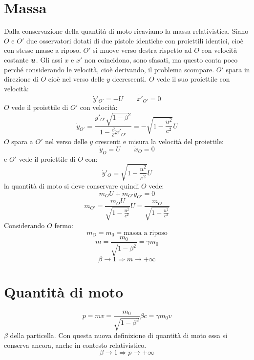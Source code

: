 \section{Massa}
Dalla conservazione della quantità di moto ricaviamo la massa relativistica. Siano $O$ e $O'$ due osservatori dotati di due pistole identiche con proiettili identici, cioè con stesse masse a riposo. $O'$ si muove verso destra rispetto ad $O$ con velocità costante  $\boldsymbol{u}$. Gli assi $x$ e $x'$ non coincidono, sono sfasati, ma questo conta poco perché considerando le velocità, cioè derivando, il problema scompare. $O'$ spara in direzione di $O$ cioè nel verso delle $y$ decrescenti. $O$ vede il suo proiettile con velocità:
\[\dot y'_{O'}=-U\qquad\dot{x'}_{O'}=0\]
$O$ vede il proiettile di $O'$ con velocità:
\[\dot y_{O'}=\frac{\dot y'_{O'}\sqrt{1-\beta^2}}{1-\frac{\beta}{c}\dot x'_{O'}}=-\sqrt{1-\frac{u^2}{c^2}}U\]
$O$ spara a $O'$ nel verso delle $y$ crescenti e misura la velocità del proiettile:
\[\dot y_{O}=U\qquad \dot x_{O}=0\]
e $O'$ vede il proiettile di $O$ con:
\[\dot y'_{O}=\sqrt{1-\frac{u^2}{c^2}}U\]
la quantità di moto si deve conservare quindi $O$ vede:
\[m_{O}U+m_{O'}\dot y_{O'}=0\]
\[m_{O'}=\frac{m_OU}{\sqrt{1-\frac{u^2}{c^2}}}U=\frac{m_O}{\sqrt{1-\frac{u^2}{c^2}}}\]
Considerando $O$ fermo:
\[m_{O}=m_0=\text{massa a riposo}\]
\[m=\frac{m_0}{\sqrt{1-\beta^2}}=\gamma m_0\]
\[\beta\rightarrow 1\Rightarrow m\rightarrow +\infty\]
\section{Quantità di moto}
\[p=mv=\frac{m_0}{\sqrt{1-\beta^2}}\beta c=\gamma m_0 v\]
$\beta$ della particella. Con questa nuova definizione di quantità di moto essa si conserva ancora, anche in contesto relativistico.
\[\beta\rightarrow 1\Rightarrow p\rightarrow +\infty\]

